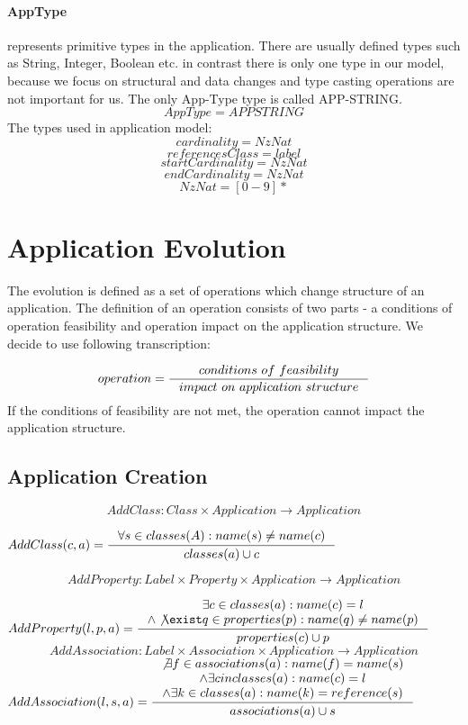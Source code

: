 \documentclass[11pt]{article}
\begin{document}
\paragraph{AppType} represents primitive types in the application. There are usually defined types such as String, Integer, Boolean etc. in contrast there is only one type in our model, because we focus on structural and data changes and type casting operations are not important for us. The only App-Type type is called APP-STRING.
$$
AppType = APPSTRING
$$
The types used in application model:
$$
cardinality = NzNat
$$
$$
referencesClass = label
$$
$$
startCardinality = NzNat
$$
$$
endCardinality = NzNat
$$
$$
NzNat = [0 - 9]*
$$




\section{Application Evolution}
\label{sec:appEvolution}

The evolution is defined as a set of operations which change structure of an application. The definition of an operation consists of two parts - a conditions of operation feasibility and operation impact on the application structure. We decide to use following transcription:

$$
operation = \inference{conditions$ $of$ $feasibility}{impact$ $on$ $application$ $structure}
$$
If the conditions of feasibility are not met, the operation cannot impact the application structure.


\subsection{Application Creation}
$$AddClass: Class \times Application \rightarrow Application $$

$
AddClass(c, a) = \inference{\forall s \in classes(A) : name(s) \neq name(c)}
{classes(a) \cup c}
$

$$AddProperty : Label \times Property \times Application \rightarrow Application $$

$
AddProperty(l, p, a) = \inference{\exists c \in classes(a) : name(c) = l \\ \wedge \not \exist q \in properties(p) : name(q) \neq name(p)}{
 properties(c) \cup p }
$
$$AddAssociation : Label \times Association \times Application \rightarrow Application $$
$
AddAssociation(l, s, a) = \inference{\not \exists f \in associations(a) : name(f) = name(s) \\ \wedge \exists c in classes(a) : name(c) = l \\ \wedge \exists k \in classes(a) : name(k) = reference(s) }{associations(a) \cup s}
$
\end{document}
